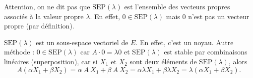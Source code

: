 Attention, on ne dit pas que {\color{red}$\mathrm{SEP}(\lambda)$\/ est l'ensemble des vecteurs propres associés à la valeur propre $\lambda$}. En effet, $0 \in \mathrm{SEP}(\lambda)$\/ mais $0$ n'est pas un vecteur propre (par définition).

\begin{rmkn}
	$\mathrm{SEP}(\lambda)$\/ est un sous-espace vectoriel de $E$.
	En effet, c'est un noyau. Autre méthode : $0\in \mathrm{SEP}(\lambda)$\/ car $A\cdot 0 = \lambda 0$\/ et $\mathrm{SEP}(\lambda)$ est stable par combinaisons linéaires (superposition), car si $X_1$\/ et $X_2$\/ sont deux éléments de $\mathrm{SEP}(\lambda)$, alors \[
		A(\alpha X_1 + \beta X_2) = \alpha\:A\:X_1 + \beta\:A\:X_2 = \alpha \lambda X_1 + \beta \lambda X_2 = \lambda(\alpha X_1 + \beta X_2)
	.\]
\end{rmkn}


